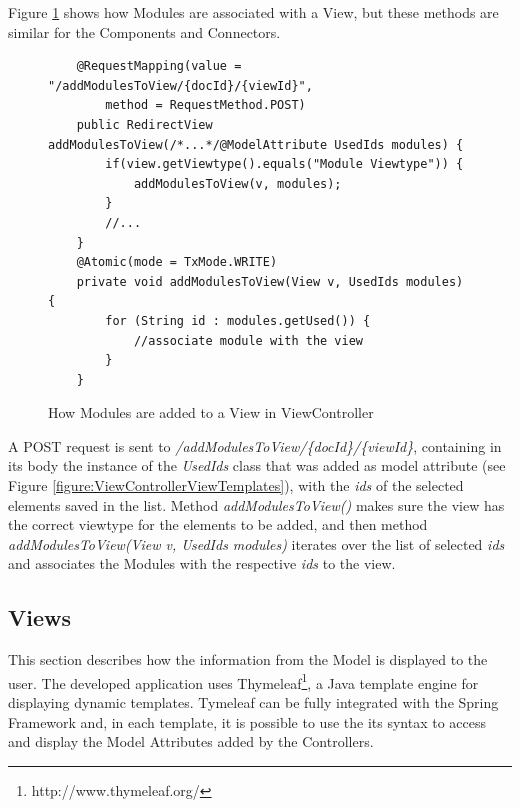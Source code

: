 \documentclass{llncs}
\begin{document}
Figure \ref{figure:ViewControllerAddModules} shows how Modules are associated with a View, but these methods are similar for the Components and Connectors. 
\begin{figure}
\lstset{style=customjava}
\begin{lstlisting}
	@RequestMapping(value = "/addModulesToView/{docId}/{viewId}", 
		method = RequestMethod.POST)
	public RedirectView addModulesToView(/*...*/@ModelAttribute UsedIds modules) {
		if(view.getViewtype().equals("Module Viewtype")) {
			addModulesToView(v, modules);
		}
		//...
	}
	@Atomic(mode = TxMode.WRITE)
	private void addModulesToView(View v, UsedIds modules) {
		for (String id : modules.getUsed()) {
			//associate module with the view
		}
	}	
\end{lstlisting}
\caption{How Modules are added to a View in ViewController}
\label{figure:ViewControllerAddModules}
\end{figure}
A POST request is sent to \textit{/addModulesToView/\{docId\}/\{viewId\}}, containing in its body the instance of the \textit{UsedIds} class that was added as model attribute (see Figure \ref{figure:ViewControllerViewTemplates}), with the \textit{ids} of the selected elements saved in the list. Method \textit{addModulesToView()} makes sure the view has the correct viewtype for the elements to be added, and then method \textit{addModulesToView(View v, UsedIds modules)} iterates over the list of selected \textit{ids} and associates the Modules with the respective \textit{ids} to the view.

\subsection{Views}
\label{section:Views}
This section describes how the information from the Model is displayed to the user. The developed application uses Thymeleaf\footnote{http://www.thymeleaf.org/}, a Java template engine for displaying dynamic templates. Tymeleaf can be fully integrated with the Spring Framework and, in each template, it is possible to use the its syntax to access and display the Model Attributes added by the Controllers. 
\end{document}
